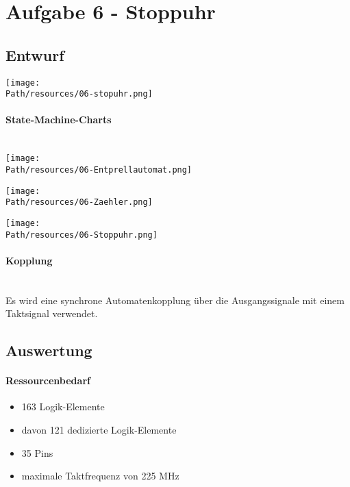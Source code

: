 \section{Aufgabe 6 - Stoppuhr}
\subsection{Entwurf}
\texttt{[image: \\Path/resources/06-stopuhr.png]}
	\newpage
	\paragraph{State-Machine-Charts}\hfill \\

		\texttt{[image: \\Path/resources/06-Entprellautomat.png]}
		

		\texttt{[image: \\Path/resources/06-Zaehler.png]}

		\texttt{[image: \\Path/resources/06-Stoppuhr.png]}
 
	\paragraph{Kopplung} \hfill\\
	Es wird eine synchrone Automatenkopplung über die Ausgangssignale mit einem Taktsignal verwendet.
\subsection{Auswertung}
	\paragraph{Ressourcenbedarf}
	\begin{itemize} 
	\item 163 Logik-Elemente
	\item davon 121 dedizierte Logik-Elemente
	\item 35 Pins 
	\item maximale Taktfrequenz von 225 MHz
	\end{itemize}
